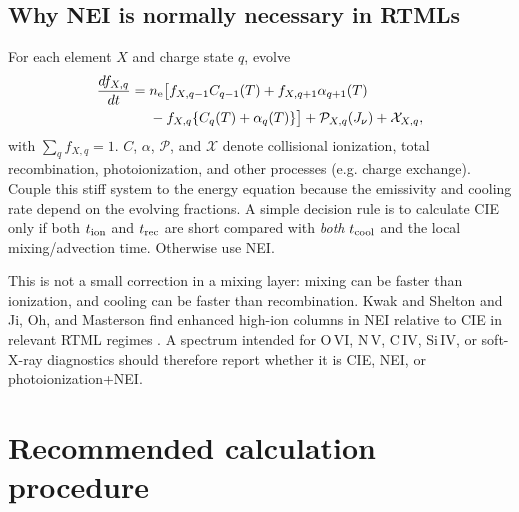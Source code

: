 \documentclass[english,a4paper]{my_memo2}
\newcommand{\nelec}{n_{\rm e}}
\newcommand{\tcool}{t_{\rm cool}}
\begin{document}
\subsection{Why NEI is normally necessary in RTMLs}
\label{sec:nei}

For each element $X$ and charge state $q$, evolve
\begin{align}
 \frac{df_{X,q}}{dt}={}&\nelec\big[f_{X,q-1}C_{q-1}(T)+f_{X,q+1}\alpha_{q+1}(T)\\
 &-f_{X,q}\{C_q(T)+\alpha_q(T)\}\big]+\mathcal{P}_{X,q}(J_\nu)
 +\mathcal{X}_{X,q},
 \label{eq:nei}
\end{align}
with $\sum_qf_{X,q}=1$.  $C$, $\alpha$, $\mathcal{P}$, and $\mathcal{X}$
denote collisional ionization, total recombination, photoionization, and other
processes (e.g. charge exchange).  Couple this stiff system to the energy
equation because the emissivity and cooling rate depend on the evolving
fractions.  A simple decision rule is to calculate CIE only if both
$t_{\rm ion}$ and $t_{\rm rec}$ are short compared with \emph{both}
$\tcool$ and the local mixing/advection time.  Otherwise use NEI.

This is not a small correction in a mixing layer: mixing can be faster than
ionization, and cooling can be faster than recombination.  Kwak and Shelton
and Ji, Oh, and Masterson find enhanced high-ion columns in NEI relative to
CIE in relevant RTML regimes \cite{Kwak2010,Ji2019}.  A spectrum intended for
O\,VI, N\,V, C\,IV, Si\,IV, or soft-X-ray diagnostics should therefore report
whether it is CIE, NEI, or photoionization+NEI.

\section{Recommended calculation procedure}
\end{document}
